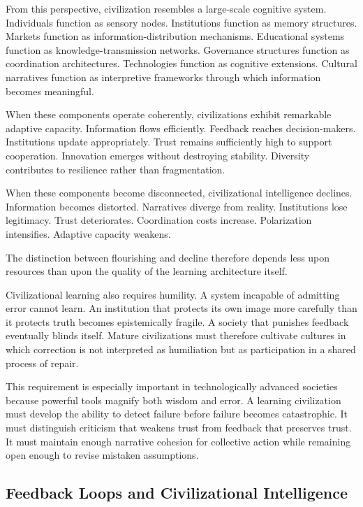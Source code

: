 \documentclass[12pt]{article}
\begin{document}
From this perspective, civilization resembles a large-scale cognitive system. Individuals function as sensory nodes. Institutions function as memory structures. Markets function as information-distribution mechanisms. Educational systems function as knowledge-transmission networks. Governance structures function as coordination architectures. Technologies function as cognitive extensions. Cultural narratives function as interpretive frameworks through which information becomes meaningful.

When these components operate coherently, civilizations exhibit remarkable adaptive capacity. Information flows efficiently. Feedback reaches decision-makers. Institutions update appropriately. Trust remains sufficiently high to support cooperation. Innovation emerges without destroying stability. Diversity contributes to resilience rather than fragmentation.

When these components become disconnected, civilizational intelligence declines. Information becomes distorted. Narratives diverge from reality. Institutions lose legitimacy. Trust deteriorates. Coordination costs increase. Polarization intensifies. Adaptive capacity weakens.

The distinction between flourishing and decline therefore depends less upon resources than upon the quality of the learning architecture itself.

Civilizational learning also requires humility. A system incapable of admitting error cannot learn. An institution that protects its own image more carefully than it protects truth becomes epistemically fragile. A society that punishes feedback eventually blinds itself. Mature civilizations must therefore cultivate cultures in which correction is not interpreted as humiliation but as participation in a shared process of repair.

This requirement is especially important in technologically advanced societies because powerful tools magnify both wisdom and error. A learning civilization must develop the ability to detect failure before failure becomes catastrophic. It must distinguish criticism that weakens trust from feedback that preserves trust. It must maintain enough narrative cohesion for collective action while remaining open enough to revise mistaken assumptions.

\subsection{Feedback Loops and Civilizational Intelligence}
\end{document}
